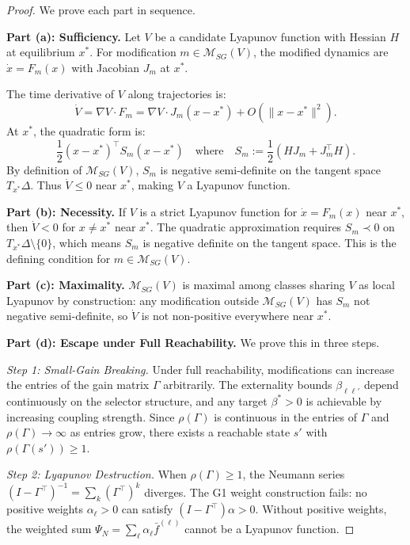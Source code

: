 \documentclass[12pt]{article}
\begin{document}
\begin{proof}
We prove each part in sequence.

\textbf{Part (a): Sufficiency.}
Let $V$ be a candidate Lyapunov function with Hessian $H$ at equilibrium $x^*$. For modification $m \in \mathcal{M}_{SG}(V)$, the modified dynamics are $\dot{x} = F_m(x)$ with Jacobian $J_m$ at $x^*$.

The time derivative of $V$ along trajectories is:
\[
\dot{V} = \nabla V \cdot F_m = \nabla V \cdot J_m (x - x^*) + O(\|x - x^*\|^2).
\]
At $x^*$, the quadratic form is:
\[
\frac{1}{2}(x - x^*)^\top S_m (x - x^*) \quad \text{where} \quad S_m := \frac{1}{2}(H J_m + J_m^\top H).
\]
By definition of $\mathcal{M}_{SG}(V)$, $S_m$ is negative semi-definite on the tangent space $T_{x^*}\Delta$. Thus $\dot{V} \leq 0$ near $x^*$, making $V$ a Lyapunov function.

\textbf{Part (b): Necessity.}
If $V$ is a strict Lyapunov function for $\dot{x} = F_m(x)$ near $x^*$, then $\dot{V} < 0$ for $x \neq x^*$ near $x^*$. The quadratic approximation requires $S_m \prec 0$ on $T_{x^*}\Delta \setminus \{0\}$, which means $S_m$ is negative definite on the tangent space. This is the defining condition for $m \in \mathcal{M}_{SG}(V)$.

\textbf{Part (c): Maximality.}
$\mathcal{M}_{SG}(V)$ is maximal among classes sharing $V$ as local Lyapunov by construction: any modification outside $\mathcal{M}_{SG}(V)$ has $S_m$ not negative semi-definite, so $\dot{V}$ is not non-positive everywhere near $x^*$.

\textbf{Part (d): Escape under Full Reachability.}
We prove this in three steps.

\textit{Step 1: Small-Gain Breaking.}
Under full reachability, modifications can increase the entries of the gain matrix $\Gamma$ arbitrarily. The externality bounds $\beta_{\ell\ell'}$ depend continuously on the selector structure, and any target $\beta^* > 0$ is achievable by increasing coupling strength. Since $\rho(\Gamma)$ is continuous in the entries of $\Gamma$ and $\rho(\Gamma) \to \infty$ as entries grow, there exists a reachable state $s'$ with $\rho(\Gamma(s')) \geq 1$.

\textit{Step 2: Lyapunov Destruction.}
When $\rho(\Gamma) \geq 1$, the Neumann series $(I - \Gamma^\top)^{-1} = \sum_k (\Gamma^\top)^k$ diverges. The G1 weight construction fails: no positive weights $\alpha_\ell > 0$ can satisfy $(I - \Gamma^\top)\alpha > 0$. Without positive weights, the weighted sum $\Psi_N = \sum_\ell \alpha_\ell \bar{f}^{(\ell)}$ cannot be a Lyapunov function.


\end{proof}
\end{document}
